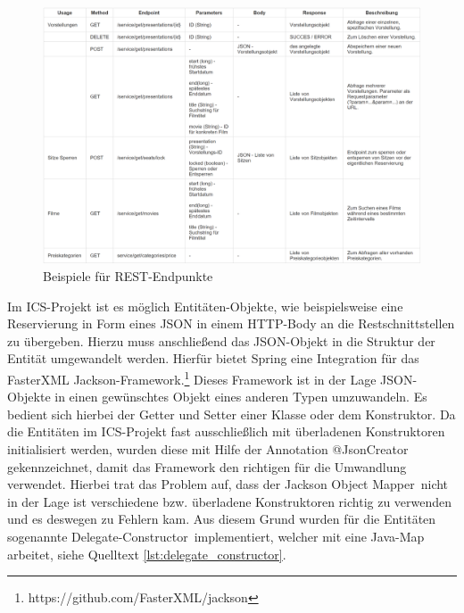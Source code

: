 	\begin{figure}[H]
		\centering 
		\includegraphics[width=\textwidth]{img/restservices}
		\captionsetup{format=hang}
		\caption[Beispiele für REST-Endpunkte]{\label{fig:restservices}Beispiele für \ac{REST}-Endpunkte}
	\end{figure}
	
	Im \ac{ICS}-Projekt ist es möglich Entitäten-Objekte, wie beispielsweise eine Reservierung in Form eines \ac{JSON} in einem \ac{HTTP}-Body an die Restschnittstellen zu übergeben. Hierzu muss anschließend das JSON-Objekt in die Struktur der Entität umgewandelt werden. Hierfür bietet Spring eine Integration für das \glqq FasterXML Jackson\grqq-Framework.\footnote{https://github.com/FasterXML/jackson} Dieses Framework ist in der Lage \ac{JSON}-Objekte in einen gewünschtes Objekt eines anderen Typen umzuwandeln. Es bedient sich hierbei der Getter und Setter einer Klasse oder dem Konstruktor. Da die Entitäten im \ac{ICS}-Projekt fast ausschließlich mit überladenen Konstruktoren initialisiert werden, wurden diese mit Hilfe der Annotation \glqq @JsonCreator\grqq \, gekennzeichnet, damit das Framework den richtigen für die Umwandlung verwendet. Hierbei trat das Problem auf, dass der \glqq Jackson Object Mapper\grqq \, nicht in der Lage ist verschiedene bzw. überladene Konstruktoren richtig zu verwenden und es deswegen zu Fehlern kam. Aus diesem Grund wurden für die Entitäten sogenannte \grqq Delegate-Constructor\grqq \, implementiert, welcher mit eine Java-Map arbeitet, siehe Quelltext \ref{lst:delegate_constructor}.
	

